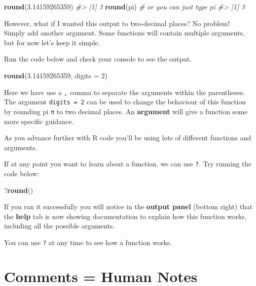 \documentclass[
]{book}
\newenvironment{Shaded}{\begin{snugshade}}{\end{snugshade}}
\newcommand{\AttributeTok}[1]{\textcolor[rgb]{0.13,0.29,0.53}{#1}}
\newcommand{\CommentTok}[1]{\textcolor[rgb]{0.56,0.35,0.01}{\textit{#1}}}
\newcommand{\DecValTok}[1]{\textcolor[rgb]{0.00,0.00,0.81}{#1}}
\newcommand{\FloatTok}[1]{\textcolor[rgb]{0.00,0.00,0.81}{#1}}
\newcommand{\FunctionTok}[1]{\textcolor[rgb]{0.13,0.29,0.53}{\textbf{#1}}}
\newcommand{\NormalTok}[1]{#1}
\let\oldsection\section
\renewcommand{\section}{\needspace{5\baselineskip}\oldsection}
\begin{document}
\begin{Shaded}
\begin{Highlighting}[]
\FunctionTok{round}\NormalTok{(}\FloatTok{3.14159265359}\NormalTok{)}
\CommentTok{\#\textgreater{} [1] 3}
\FunctionTok{round}\NormalTok{(pi) }\CommentTok{\# or you can just type \textasciigrave{}pi\textasciigrave{}}
\CommentTok{\#\textgreater{} [1] 3}
\end{Highlighting}
\end{Shaded}

However, what if I wanted this output to two-decimal places? No problem! Simply add another argument. Some functions will contain multiple arguments, but for now let's keep it simple.

Run the code below and check your console to see the output.

\begin{Shaded}
\begin{Highlighting}[]
\FunctionTok{round}\NormalTok{(}\FloatTok{3.14159265359}\NormalTok{, }\AttributeTok{digits =} \DecValTok{2}\NormalTok{)}
\end{Highlighting}
\end{Shaded}

Here we have use a \texttt{,} comma to separate the arguments within the parentheses. The argument \texttt{digits\ =\ 2} can be used to change the behaviour of this function by rounding pi \texttt{π} to two decimal places. An \textbf{argument} will give a function some more specific guidance.

As you advance further with R code you'll be using lots of different functions and arguments.

If at any point you want to learn about a function, we can use \texttt{?}. Try running the code below:

\begin{Shaded}
\begin{Highlighting}[]
\NormalTok{?}\FunctionTok{round}\NormalTok{()}
\end{Highlighting}
\end{Shaded}

If you ran it successfully you will notice in the \textbf{output panel} (bottom right) that the \textbf{help} tab is now showing documentation to explain how this function works, including all the possible arguments.

You can use \texttt{?} at any time to see how a function works.

\section{Comments = Human Notes}\label{comments-human-notes}
\end{document}
